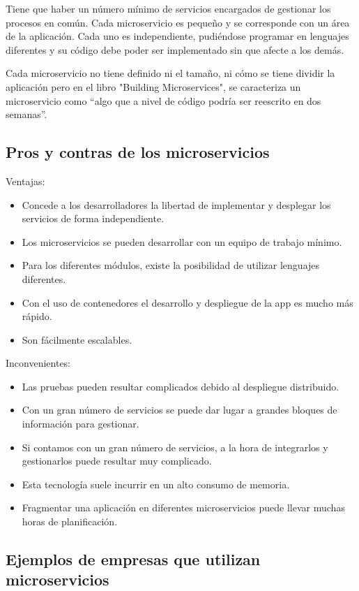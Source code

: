 \documentclass[12pt]{report} %
\begin{document}
Tiene que haber un número mínimo de servicios encargados de gestionar los procesos en común. Cada microservicio es pequeño y se corresponde con un área de la aplicación. Cada uno es independiente, pudiéndose programar en lenguajes diferentes y su código debe poder ser implementado sin que afecte a los demás.

Cada microservicio no tiene definido ni el tamaño, ni cómo se tiene dividir la aplicación pero en el libro "Building Microservices", \cite{BuildingMicroservices}se caracteriza un microservicio como “algo que a nivel de código podría ser reescrito en dos semanas”.

\subsection{Pros y contras de los microservicios}
Ventajas:
\begin{itemize}
	\item Concede a los desarrolladores la libertad de implementar y desplegar los servicios de forma independiente.
	\item Los microservicios se pueden desarrollar con un equipo de trabajo mínimo.
	\item Para los diferentes módulos, existe la posibilidad de utilizar lenguajes diferentes.
	\item Con el uso de contenedores el desarrollo y despliegue de la app es mucho más rápido.
	\item Son fácilmente escalables.
\end{itemize}
Inconvenientes:
\begin{itemize}
	\item Las pruebas pueden resultar complicados debido al despliegue distribuido.
	\item Con un gran número de servicios se puede dar lugar a grandes bloques de información para gestionar.
	\item Si contamos con un gran número de servicios, a la hora de integrarlos y gestionarlos puede resultar muy complicado.
	\item Esta tecnología suele incurrir en un alto consumo de memoria.
	\item Fragmentar una aplicación en diferentes microservicios puede llevar muchas horas de planificación.
\end{itemize}

\subsection{Ejemplos de empresas que utilizan microservicios}
\end{document}
